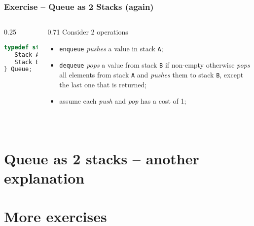 \documentclass[aspectratio=169]{beamer}
\begin{document}
\begin{frame}[fragile]\frametitle{Exercise -- Queue as 2 Stacks (again)}

\begin{columns}
\begin{column}{0.25\textwidth}
\begin{lstlisting}[language=C++,emph={Stack,Queue}]
typedef struct queue {
   Stack A;
   Stack B;
} Queue;
\end{lstlisting}
\end{column}
\begin{column}{0.71\textwidth}
Consider 2 operations
\begin{itemize}
    \item \texttt{enqueue} \emph{pushes} a value in stack \texttt{A};
    \item \texttt{dequeue} \emph{pops} a value from stack \texttt{B} if non-empty otherwise \emph{pops} all elements from stack \texttt{A} and \emph{pushes} them to stack \texttt{B}, except the last one that is returned;
    \item assume each \emph{push} and \emph{pop} has a cost of 1;
  \end{itemize}
\end{column}
\end{columns}

~\\[-3mm]
\end{frame}




\section{Queue as 2 stacks -- another explanation}



\section{More exercises}
\end{document}
